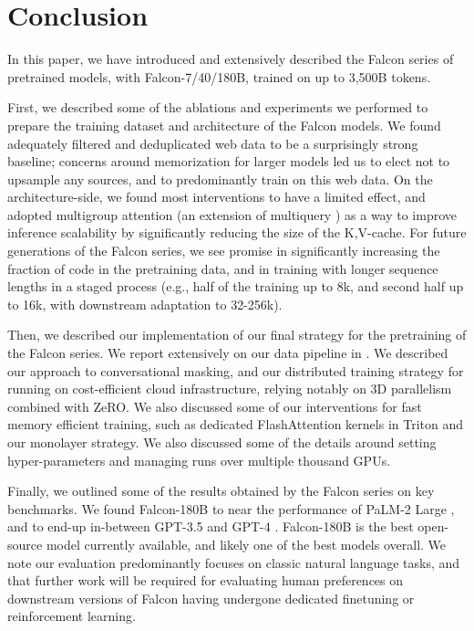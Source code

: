 \documentclass{article}
\begin{document}
\section{Conclusion}

In this paper, we have introduced and extensively described the Falcon series of pretrained models, with Falcon-7/40/180B, trained on up to 3,500B tokens. 

First, we described some of the ablations and experiments we performed to prepare the training dataset and architecture of the Falcon models. We found adequately filtered and deduplicated web data to be a surprisingly strong baseline; concerns around memorization for larger models \citep{carlini2022quantifying, hernandez2022scaling} led us to elect not to upsample any sources, and to predominantly train on this web data. On the architecture-side, we found most interventions to have a limited effect, and adopted multigroup attention (an extension of multiquery \citep{multiquery}) as a way to improve inference scalability by significantly reducing the size of the K,V-cache. For future generations of the Falcon series, we see promise in significantly increasing the fraction of code in the pretraining data, and in training with longer sequence lengths in a staged process (e.g., half of the training up to 8k, and second half up to 16k, with downstream adaptation to 32-256k).

Then, we described our implementation of our final strategy for the pretraining of the Falcon series. We report extensively on our data pipeline in \citet{refinedweb}. We described our approach to conversational masking, and our distributed training strategy for running on cost-efficient cloud infrastructure, relying notably on 3D parallelism combined with ZeRO. We also discussed some of our interventions for fast memory efficient training, such as dedicated FlashAttention \citep{flash_attn} kernels in Triton \citep{triton} and our monolayer strategy. We also discussed some of the details around setting hyper-parameters and managing runs over multiple thousand GPUs.

Finally, we outlined some of the results obtained by the Falcon series on key benchmarks. We found Falcon-180B to near the performance of PaLM-2 Large \citep{palm-2}, and to end-up in-between GPT-3.5 and GPT-4 \citep{gpt-4}. Falcon-180B is the best open-source model currently available, and likely one of the best models overall. We note our evaluation predominantly focuses on classic natural language tasks, and that further work will be required for evaluating human preferences on downstream versions of Falcon having undergone dedicated finetuning or reinforcement learning.
\end{document}
